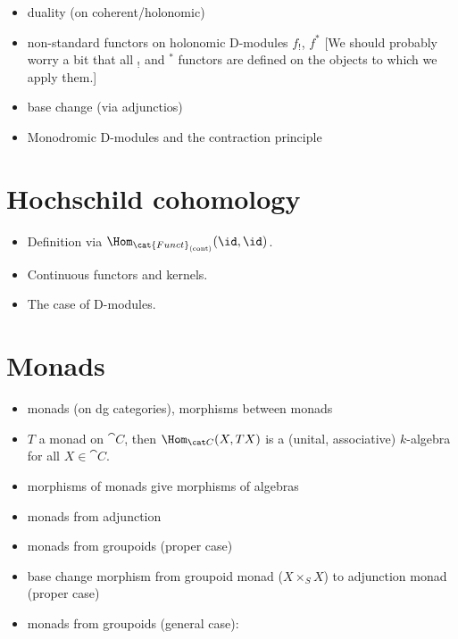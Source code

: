\begin{itemize}
    \item duality (on coherent/holonomic)
    \item non-standard functors on holonomic D-modules $f_!$, $f^*$ [We should probably worry a bit that all $_!$ and $^*$ functors are defined on the objects to which we apply them.]
    \item base change (via adjunctios)
    \item Monodromic D-modules and the contraction principle
\end{itemize}

\section{Hochschild cohomology}

\begin{itemize}
    \item Definition via $\Hom_{\cat{Funct}_{\text{(cont)}}}(\id, \id)$.
    \item Continuous functors and kernels.
    \item The case of D-modules.
\end{itemize}

\section{Monads}
\label{sec:d-mod:pre:monads}

\begin{itemize}
    \item monads (on dg categories), morphisms between monads
    \item $T$ a monad on $\cat C$, then $\Hom_{\cat C}(X, TX)$ is a (unital, associative) $k$-algebra for all $X ∈ \cat C$.
    \item morphisms of monads give morphisms of algebras
    \item monads from adjunction
    \item monads from groupoids (proper case)
    \item base change morphism from groupoid monad ($X ×_S X$) to adjunction monad (proper case)
    \item monads from groupoids (general case): \cite[Lemma~II.1.7.1.4]{GaitsgoryRozenblyum:prelim:StudyInDAG}
\end{itemize}

